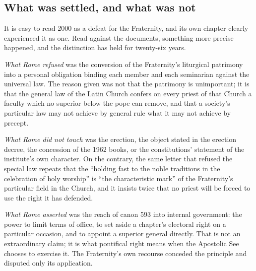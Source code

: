 \subsection{What was settled, and what was not}

It is easy to read 2000 as a defeat for the Fraternity, and its own
chapter clearly experienced it as one. Read against the documents,
something more precise happened, and the distinction has held for
twenty-six years.

\emph{What Rome refused} was the conversion of the Fraternity's
liturgical patrimony into a personal obligation binding each member and
each seminarian against the universal law. The reason given was not that
the patrimony is unimportant; it is that the general law of the Latin
Church confers on every priest of that Church a faculty which no superior
below the pope can remove, and that a society's particular law may not
achieve by general rule what it may not achieve by precept.

\emph{What Rome did not touch} was the erection, the object stated in the
erection decree, the concession of the 1962 books, or the constitutions'
statement of the institute's own character. On the contrary, the same
letter that refused the special law repeats that the ``holding fast to the
noble traditions in the celebration of holy worship'' is ``the
characteristic mark'' of the Fraternity's particular field in the Church,
and it insists twice that no priest will be forced to use the right it has
defended.

\emph{What Rome asserted} was the reach of canon 593 into internal
government: the power to limit terms of office, to set aside a chapter's
electoral right on a particular occasion, and to appoint a superior
general directly. That is not an extraordinary claim; it is what
pontifical right means when the Apostolic See chooses to exercise it. The
Fraternity's own recourse conceded the principle and disputed only its
application.

